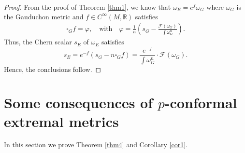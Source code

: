 \documentclass[12pt]{amsart}
\theoremstyle{plain}
\theoremstyle{definition}
\newcommand{\beq}{\begin{equation}}
\newcommand{\eeq}{\end{equation}}
\renewcommand{\>}{\rightarrow}
\newcommand{\R}{{\mathbb R}}
\renewcommand{\#}{\sharp}
\newcommand{\vphi}{\varphi}
\newcommand{\lrp}[1]{\left( #1\right)}
\numberwithin{equation}{section} %
\begin{document}
    \begin{proof}
        From the proof of Theorem \ref{thm1}, we know that $\omega_E=e^f\omega_G$ where $\omega_G$ is the Gauduchon metric and $f\in C^\infty(M,\R)$ satisfies
        \begin{align}
            \square_Gf=\vphi,\quad\text{with}\quad\vphi=\frac1n\lrp{s_G-\frac{\mathscr F(\omega_G)}{\int\omega_G^n}}.
        \end{align}
        Thus, the Chern scalar $s_E$ of $\omega_E$ satisfies
        \beq
            s_E=e^{-f}(s_G-n\square_G f)=\frac{e^{-f}}{\int\omega_G^n}\cdot \mathscr F(\omega_G).
        \eeq
        Hence, the conclusions follow.
    \end{proof}


\baselineskip

\section{Some consequences of $p$-conformal extremal metrics}
In this section we prove Theorem \ref{thm4} and Corollary \ref{cor1}.
\end{document}
